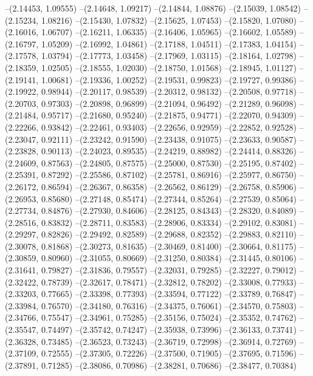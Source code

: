 --(2.14453, 1.09555)
--(2.14648, 1.09217)
--(2.14844, 1.08876)
--(2.15039, 1.08542)
--(2.15234, 1.08216)
--(2.15430, 1.07832)
--(2.15625, 1.07453)
--(2.15820, 1.07080)
--(2.16016, 1.06707)
--(2.16211, 1.06335)
--(2.16406, 1.05965)
--(2.16602, 1.05589)
--(2.16797, 1.05209)
--(2.16992, 1.04861)
--(2.17188, 1.04511)
--(2.17383, 1.04154)
--(2.17578, 1.03794)
--(2.17773, 1.03458)
--(2.17969, 1.03115)
--(2.18164, 1.02798)
--(2.18359, 1.02505)
--(2.18555, 1.02030)
--(2.18750, 1.01568)
--(2.18945, 1.01127)
--(2.19141, 1.00681)
--(2.19336, 1.00252)
--(2.19531, 0.99823)
--(2.19727, 0.99386)
--(2.19922, 0.98944)
--(2.20117, 0.98539)
--(2.20312, 0.98132)
--(2.20508, 0.97718)
--(2.20703, 0.97303)
--(2.20898, 0.96899)
--(2.21094, 0.96492)
--(2.21289, 0.96098)
--(2.21484, 0.95717)
--(2.21680, 0.95240)
--(2.21875, 0.94771)
--(2.22070, 0.94309)
--(2.22266, 0.93842)
--(2.22461, 0.93403)
--(2.22656, 0.92959)
--(2.22852, 0.92528)
--(2.23047, 0.92111)
--(2.23242, 0.91590)
--(2.23438, 0.91075)
--(2.23633, 0.90587)
--(2.23828, 0.90113)
--(2.24023, 0.89535)
--(2.24219, 0.88982)
--(2.24414, 0.88326)
--(2.24609, 0.87563)
--(2.24805, 0.87575)
--(2.25000, 0.87530)
--(2.25195, 0.87402)
--(2.25391, 0.87292)
--(2.25586, 0.87102)
--(2.25781, 0.86916)
--(2.25977, 0.86750)
--(2.26172, 0.86594)
--(2.26367, 0.86358)
--(2.26562, 0.86129)
--(2.26758, 0.85906)
--(2.26953, 0.85680)
--(2.27148, 0.85474)
--(2.27344, 0.85264)
--(2.27539, 0.85064)
--(2.27734, 0.84876)
--(2.27930, 0.84606)
--(2.28125, 0.84343)
--(2.28320, 0.84089)
--(2.28516, 0.83832)
--(2.28711, 0.83583)
--(2.28906, 0.83334)
--(2.29102, 0.83081)
--(2.29297, 0.82826)
--(2.29492, 0.82589)
--(2.29688, 0.82352)
--(2.29883, 0.82110)
--(2.30078, 0.81868)
--(2.30273, 0.81635)
--(2.30469, 0.81400)
--(2.30664, 0.81175)
--(2.30859, 0.80960)
--(2.31055, 0.80669)
--(2.31250, 0.80384)
--(2.31445, 0.80106)
--(2.31641, 0.79827)
--(2.31836, 0.79557)
--(2.32031, 0.79285)
--(2.32227, 0.79012)
--(2.32422, 0.78739)
--(2.32617, 0.78471)
--(2.32812, 0.78202)
--(2.33008, 0.77933)
--(2.33203, 0.77665)
--(2.33398, 0.77393)
--(2.33594, 0.77122)
--(2.33789, 0.76847)
--(2.33984, 0.76570)
--(2.34180, 0.76316)
--(2.34375, 0.76061)
--(2.34570, 0.75803)
--(2.34766, 0.75547)
--(2.34961, 0.75285)
--(2.35156, 0.75024)
--(2.35352, 0.74762)
--(2.35547, 0.74497)
--(2.35742, 0.74247)
--(2.35938, 0.73996)
--(2.36133, 0.73741)
--(2.36328, 0.73485)
--(2.36523, 0.73243)
--(2.36719, 0.72998)
--(2.36914, 0.72769)
--(2.37109, 0.72555)
--(2.37305, 0.72226)
--(2.37500, 0.71905)
--(2.37695, 0.71596)
--(2.37891, 0.71285)
--(2.38086, 0.70986)
--(2.38281, 0.70686)
--(2.38477, 0.70384)
